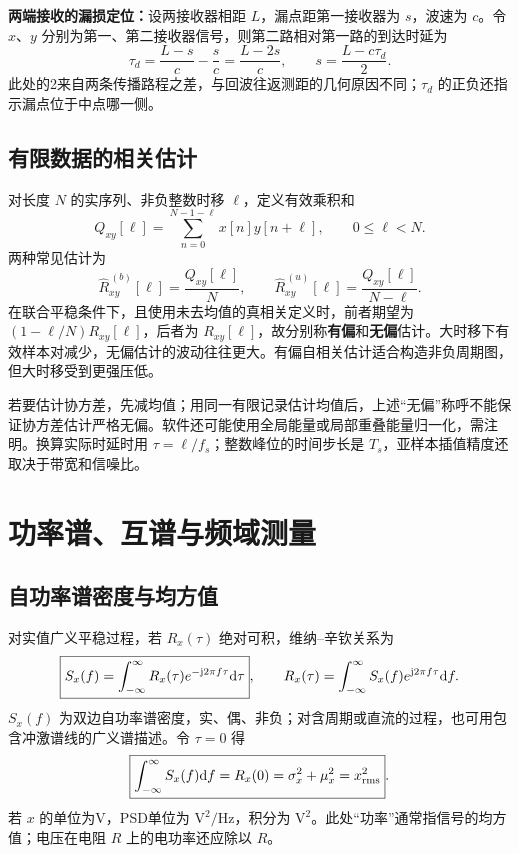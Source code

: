 \Needspace{4cm}
\textbf{两端接收的漏损定位：}设两接收器相距 $L$，漏点距第一接收器为 $s$，波速为 $c$。令 $x$、$y$ 分别为第一、第二接收器信号，则第二路相对第一路的到达时延为
\[
\tau_d=\frac{L-s}{c}-\frac{s}{c}=\frac{L-2s}{c},
\qquad \boxed{s=\frac{L-c\tau_d}{2}}.
\]
此处的2来自两条传播路程之差，与回波往返测距的几何原因不同；$\tau_d$ 的正负还指示漏点位于中点哪一侧。

\subsection{有限数据的相关估计}
对长度 $N$ 的实序列、非负整数时移 $\ell$，定义有效乘积和
\[
Q_{xy}[\ell]=\sum_{n=0}^{N-1-\ell}x[n]y[n+\ell],\qquad 0\leq\ell<N.
\]
两种常见估计为
\[
\widehat R_{xy}^{\,(b)}[\ell]=\frac{Q_{xy}[\ell]}{N},\qquad
\widehat R_{xy}^{\,(u)}[\ell]=\frac{Q_{xy}[\ell]}{N-\ell}.
\]
在联合平稳条件下，且使用未去均值的真相关定义时，前者期望为 $(1-\ell/N)R_{xy}[\ell]$，后者为 $R_{xy}[\ell]$，故分别称\textbf{有偏}和\textbf{无偏}估计。大时移下有效样本对减少，无偏估计的波动往往更大。有偏自相关估计适合构造非负周期图，但大时移受到更强压低。

若要估计协方差，先减均值；用同一有限记录估计均值后，上述“无偏”称呼不能保证协方差估计严格无偏。软件还可能使用全局能量或局部重叠能量归一化，需注明。换算实际时延时用 $\tau=\ell/f_s$；整数峰位的时间步长是 $T_s$，亚样本插值精度还取决于带宽和信噪比。

\Needspace{8cm}
\section{功率谱、互谱与频域测量}

\subsection{自功率谱密度与均方值}
\noindent{}

对实值广义平稳过程，若 $R_x(\tau)$ 绝对可积，维纳--辛钦关系为
\[
\boxed{S_x(f)=\int_{-\infty}^{\infty}R_x(\tau)e^{-\mathrm{j}2\pi f\tau}\mathrm{d}\tau},\qquad
R_x(\tau)=\int_{-\infty}^{\infty}S_x(f)e^{\mathrm{j}2\pi f\tau}\mathrm{d} f.
\]
$S_x(f)$ 为双边自功率谱密度，实、偶、非负；对含周期或直流的过程，也可用包含冲激谱线的广义谱描述。令 $\tau=0$ 得
\[
\boxed{\int_{-\infty}^{\infty}S_x(f)\mathrm{d} f
=R_x(0)=\sigma_x^2+\mu_x^2=x_{\mathrm{rms}}^2}.
\]
若 $x$ 的单位为V，PSD单位为 $\mathrm{V^2/Hz}$，积分为 $\mathrm{V^2}$。此处“功率”通常指信号的均方值；电压在电阻 $R$ 上的电功率还应除以 $R$。

